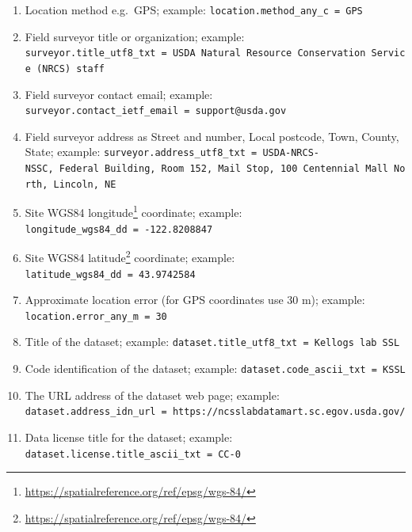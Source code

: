 \documentclass[
  graybox,natbib,nospthms]{svmono}
\renewcommand{\href}[2]{#2 (\url{#1})}
\renewcommand{\href}[2]{#2\footnote{\url{#1}}}
\begin{document}
\begin{enumerate}
\item
  Location method e.g.~GPS; example: \texttt{location.method\_any\_c\ =\ \textquotesingle{}GPS\textquotesingle{}}\\
\item
  Field surveyor title or organization; example: \texttt{surveyor.title\_utf8\_txt\ =\ \textquotesingle{}USDA\ Natural\ Resource\ Conservation\ Service\ (NRCS)\ staff\textquotesingle{}}\\
\item
  Field surveyor contact email; example: \texttt{surveyor.contact\_ietf\_email\ =\ \textquotesingle{}support@usda.gov\textquotesingle{}}\\
\item
  Field surveyor address as Street and number, Local postcode, Town, County, State; example: \texttt{surveyor.address\_utf8\_txt\ =\ \textquotesingle{}USDA-NRCS-NSSC,\ Federal\ Building,\ Room\ 152,\ Mail\ Stop,\ 100\ Centennial\ Mall\ North,\ Lincoln,\ NE\textquotesingle{}}\\
\item
  Site \href{https://spatialreference.org/ref/epsg/wgs-84/}{WGS84 longitude} coordinate; example: \texttt{longitude\_wgs84\_dd\ =\ \textquotesingle{}-122.8208847\textquotesingle{}}\\
\item
  Site \href{https://spatialreference.org/ref/epsg/wgs-84/}{WGS84 latitude} coordinate; example: \texttt{latitude\_wgs84\_dd\ =\ \textquotesingle{}43.9742584\textquotesingle{}}\\
\item
  Approximate location error (for GPS coordinates use 30 m); example: \texttt{location.error\_any\_m\ =\ \textquotesingle{}30\textquotesingle{}}\\
\item
  Title of the dataset; example: \texttt{dataset.title\_utf8\_txt\ =\ \textquotesingle{}Kellog\textquotesingle{}s\ lab\ SSL\textquotesingle{}}\\
\item
  Code identification of the dataset; example: \texttt{dataset.code\_ascii\_txt\ =\ \textquotesingle{}KSSL\textquotesingle{}}\\
\item
  The URL address of the dataset web page; example: \texttt{dataset.address\_idn\_url\ =\ \textquotesingle{}https://ncsslabdatamart.sc.egov.usda.gov/\textquotesingle{}}\\
\item
  Data license title for the dataset; example: \texttt{dataset.license.title\_ascii\_txt\ =\ \textquotesingle{}CC-0\textquotesingle{}}\\

\end{enumerate}
\end{document}
